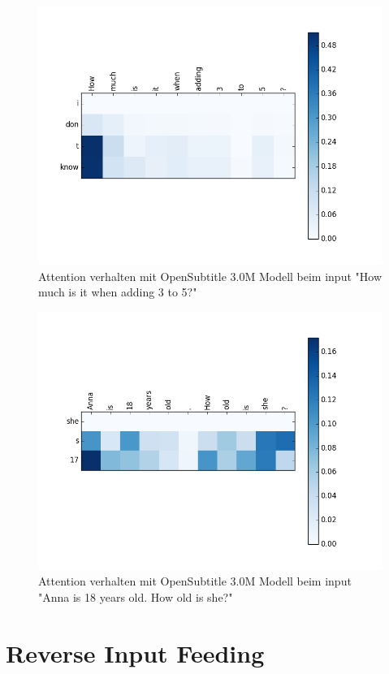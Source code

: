 \begin{figure}[H]
	\centering
	\includegraphics[width=16cm]{img/attention/attention_visualization2_OpenSubtitle-3M.png}
	\caption{Attention verhalten mit OpenSubtitle 3.0M Modell beim input "How much is it when adding 3 to 5?"}
	\label{results:attention:example2:opensubtitles-3M}
\end{figure}

\begin{figure}[H]
	\centering
	\includegraphics[width=16cm]{img/attention/attention_visualization3_OpenSubtitle-3M.png}
	\caption{Attention verhalten mit OpenSubtitle 3.0M Modell beim input "Anna is 18 years old. How old is she?"}
	\label{results:attention:example3:opensubtitles-3M}
\end{figure}
\section{Reverse Input Feeding}
\blindtext